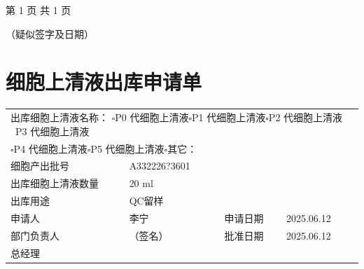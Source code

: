 \documentclass[UTF8,10pt,a4paper,fontset=fandol]{ctexart}
\newcommand{\fieldvalue}[1]{#1}
\newcommand{\handwritten}[1]{#1}
\begin{document}
\begin{center}
第 1 页 共 1 页
\end{center}

\begin{center}
\handwritten{（疑似签字及日期）}
\end{center}

\section*{细胞上清液出库申请单}

\noindent
\begin{tabularx}{\textwidth}{|p{3.2cm}|X|p{3.2cm}|X|}
\hline
\multicolumn{4}{|l|}{出库细胞上清液名称：\quad
$\square$P0 代细胞上清液\quad $\square$P1 代细胞上清液\quad $\square$P2 代细胞上清液\quad
\fieldvalue{\checkmark\ P3 代细胞上清液}}\\
\multicolumn{4}{|l|}{\hspace{3.2cm}
$\square$P4 代细胞上清液\quad $\square$P5 代细胞上清液\quad $\square$其它：\underline{\hspace{4cm}}}\\
\hline
细胞产出批号 &
\fieldvalue{\handwritten{A332226?3601}}\\
\hline
出库细胞上清液数量 &
\fieldvalue{\handwritten{20 ml}}\\
\hline
出库用途 &
\fieldvalue{\handwritten{QC留样}}\\
\hline
申请人 &
\fieldvalue{\handwritten{李宁}}
&
申请日期 &
\fieldvalue{\handwritten{2025.06.12}}\\
\hline
部门负责人 &
\fieldvalue{\handwritten{（签名）}}
&
批准日期 &
\fieldvalue{\handwritten{2025.06.12}}\\
\hline
总经理 &

\end{tabularx}
\end{document}
